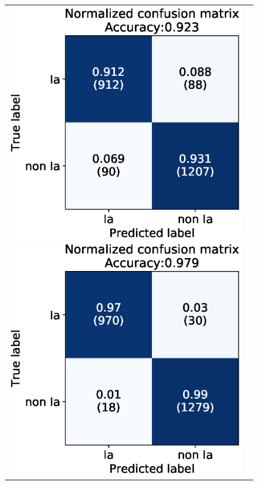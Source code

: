 \documentclass[useamsfonts]{pasj01}
\begin{document}
\begin{figure}[htbp]
    \begin{tabular}{cc}
        \begin{minipage}{0.5\hsize}
            \begin{center}
                \includegraphics[width=\columnwidth]{figures/07_CM_PLAsTiCC-1st_submission_aug22_2class_2.eps}
            \end{center}
        \end{minipage}
        \begin{minipage}{0.5\hsize}
            \begin{center}
                \includegraphics[width=\columnwidth]{figures/03_CM_abs-mag_scaled-flux_w-mixup_predictions_test_2.eps}

\end{center}
\end{minipage}
\end{tabular}
\end{figure}
\end{document}
